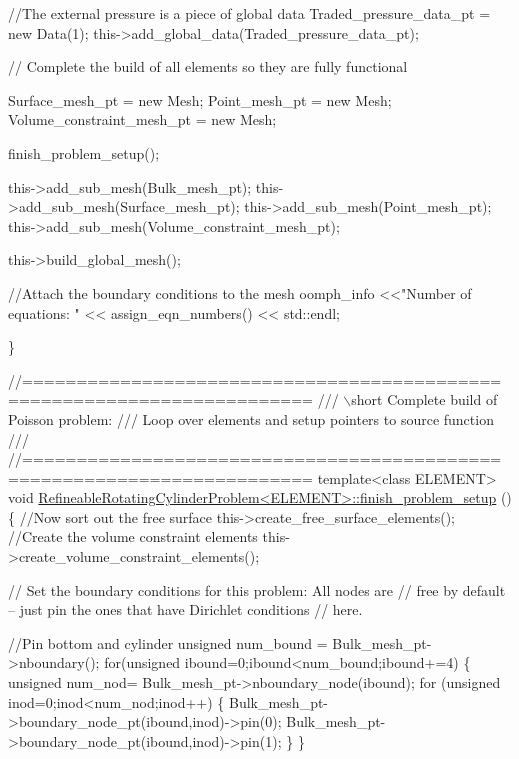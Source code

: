\begin{DoxyCodeInclude}
 \textcolor{comment}{//The external pressure is a piece of global data}
 Traded\_pressure\_data\_pt = \textcolor{keyword}{new} Data(1);
 this->add\_global\_data(Traded\_pressure\_data\_pt);

 \textcolor{comment}{// Complete the build of all elements so they are fully functional}

 Surface\_mesh\_pt = \textcolor{keyword}{new} Mesh;
 Point\_mesh\_pt = \textcolor{keyword}{new} Mesh;
 Volume\_constraint\_mesh\_pt = \textcolor{keyword}{new} Mesh;

 finish\_problem\_setup();
  
 this->add\_sub\_mesh(Bulk\_mesh\_pt);
 this->add\_sub\_mesh(Surface\_mesh\_pt);
 this->add\_sub\_mesh(Point\_mesh\_pt);
 this->add\_sub\_mesh(Volume\_constraint\_mesh\_pt);

 this->build\_global\_mesh();

 \textcolor{comment}{//Attach the boundary conditions to the mesh}
 oomph\_info <<\textcolor{stringliteral}{"Number of equations: "} << assign\_eqn\_numbers() << std::endl; 

\}


\textcolor{comment}{//========================================================================}\textcolor{comment}{}
\textcolor{comment}{/// \(\backslash\)short Complete build of Poisson problem:}
\textcolor{comment}{/// Loop over elements and setup pointers to source function}
\textcolor{comment}{///}
\textcolor{comment}{}\textcolor{comment}{//========================================================================}
\textcolor{keyword}{template}<\textcolor{keyword}{class} ELEMENT>
\textcolor{keywordtype}{void} \hyperlink{classRefineableRotatingCylinderProblem_a417d18c2584ed1ea38daefe5dd68b4a4}{RefineableRotatingCylinderProblem<ELEMENT>::finish\_problem\_setup}
      ()
\{ 
 \textcolor{comment}{//Now sort out the free surface}
 this->create\_free\_surface\_elements();
 \textcolor{comment}{//Create the volume constraint elements}
 this->create\_volume\_constraint\_elements();
 
 \textcolor{comment}{// Set the boundary conditions for this problem: All nodes are}
 \textcolor{comment}{// free by default -- just pin the ones that have Dirichlet conditions}
 \textcolor{comment}{// here. }

 \textcolor{comment}{//Pin bottom and cylinder}
  \textcolor{keywordtype}{unsigned} num\_bound = Bulk\_mesh\_pt->nboundary();
  \textcolor{keywordflow}{for}(\textcolor{keywordtype}{unsigned} ibound=0;ibound<num\_bound;ibound+=4)
   \{
    \textcolor{keywordtype}{unsigned} num\_nod= Bulk\_mesh\_pt->nboundary\_node(ibound);
    \textcolor{keywordflow}{for} (\textcolor{keywordtype}{unsigned} inod=0;inod<num\_nod;inod++)
     \{
      Bulk\_mesh\_pt->boundary\_node\_pt(ibound,inod)->pin(0);
      Bulk\_mesh\_pt->boundary\_node\_pt(ibound,inod)->pin(1);
     \}
   \}
  

\end{DoxyCodeInclude}
